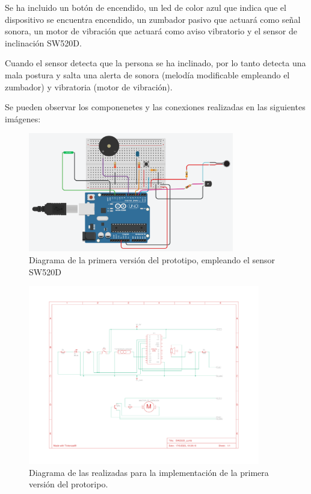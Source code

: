 Se ha incluido un botón de encendido, un led de color azul que indica que el dispositivo se encuentra encendido, un zumbador pasivo que actuará como señal sonora, un motor de vibración que actuará como aviso vibratorio y el sensor de inclinación SW520D.

Cuando el sensor detecta que la persona se ha inclinado, por lo tanto detecta una mala postura y salta una alerta de sonora (melodía modificable empleando el zumbador) y vibratoria (motor de vibración).

Se pueden observar los componenetes y las conexiones realizadas en las siguientes imágenes:

\begin{figure}[h!]
    \centering
    \includegraphics[width=0.8\textwidth]{img/PrototipoV1_Tilt.png}
    \caption{Diagrama de la primera versión del prototipo, empleando el sensor SW520D}
    \label{fig:ProtV1} %
\end{figure}

\begin{figure}[h]
    \centering
    \includegraphics[width=0.9\textwidth]{img/Prot_V1_Esquema.pdf}
    \caption{Diagrama de las realizadas para la implementación de la primera versión del protoripo.}
    \label{fig:ProtV1_esquema} %
\end{figure}



